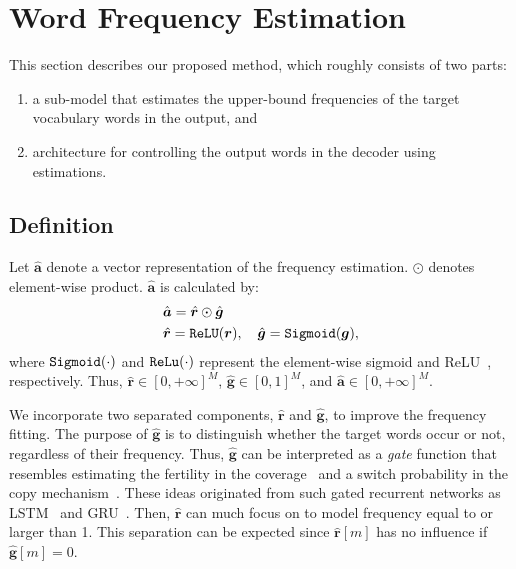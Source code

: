\documentclass[11pt]{article}
\begin{document}
   
\section{Word Frequency Estimation}
   This section describes our proposed method, which roughly
   consists of two parts:
   \begin{enumerate}
    \item a sub-model that estimates the upper-bound frequencies of the target vocabulary words in the output, and 
    \item  architecture for controlling the output words in the decoder using estimations.
   \end{enumerate}

\subsection{Definition}
   Let $\hat{\bm{a}}$ denote a vector representation of the frequency estimation. 
   $\odot$ denotes element-wise product.
   $\hat{\bm{a}}$ is calculated by:
\begin{align}
 &
 \hat{\bm{a}}
 =
 \hat{\bm{r}}
 \odot
 \hat{\bm{g}}
 \nonumber \\
 &
 \hat{\bm{r}} = {\tt ReLU} (\bm{r})%
 ,
 \,\,\,\,\,\,
 \hat{\bm{g}} = {\tt Sigmoid} (\bm{g})
 \label{eq:wae_model}
 ,
\end{align}
   where ${\tt Sigmoid}(\cdot)$ and ${\tt ReLu}(\cdot)$ represent the element-wise sigmoid and ReLU~\cite{AISTATS2011_GlorotBB11}, respectively.
   Thus, $\hat{\bm{r}}\!\in\![0, +\infty]^{M}$,
   $\hat{\bm{g}}\!\in\![0,1]^{M}$, and
   $\hat{\bm{a}}\!\in\! [0, +\infty]^{M}$.

   We incorporate two separated components, $\hat{\bm{r}}$ and $\hat{\bm{g}}$, to improve the frequency fitting.
   The purpose of $\hat{\bm{g}}$ is to distinguish whether the target words occur or not, regardless of their frequency.
   Thus, $\hat{\bm g}$ can be interpreted as a {\it gate} function that resembles estimating the fertility in the coverage~\cite{tu-EtAl:2016:P16-1} and a switch probability in the copy mechanism~\cite{gulcehre-EtAl:2016:P16-1}.
   These ideas originated from such gated recurrent networks as LSTM~\cite{Hochreiter:1997:LSM:1246443.1246450} and GRU~\cite{DBLP:journals/corr/ChungGCB14}. 
   Then, $\hat{\bm{r}}$ can much focus on to model frequency equal to or larger than 1.
   This separation can be expected since $\hat{\bm{r}}[m]$ has no influence if $\hat{\bm{g}}[m]\!=\!0$.
\end{document}
